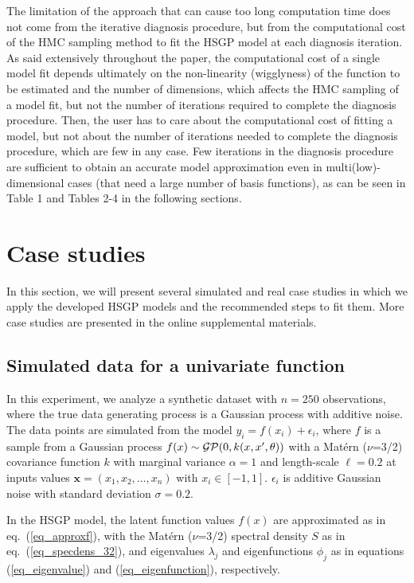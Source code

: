 {\color{blue}The limitation of the approach that can cause too long computation time does not come from the iterative diagnosis procedure, but from the computational cost of the HMC sampling method to fit the HSGP model at each diagnosis iteration. As said extensively throughout the paper, the computational cost of a single model fit depends ultimately on the non-linearity (wigglyness) of the function to be estimated and the number of dimensions, which affects the HMC sampling of a model fit, but not the number of iterations required to complete the diagnosis procedure. Then, the user has to care about the computational cost of fitting a model, but not about the number of iterations needed to complete the diagnosis procedure, which are few in any case. Few iterations in the diagnosis procedure are sufficient to obtain an accurate model approximation even in multi(low)-dimensional cases (that need a large number of basis functions), as can be seen in Table 1 and Tables 2-4 in the following sections.}


\section{Case studies}\label{sec_cases}

In this section, we will present several simulated and real case studies in which we apply the developed HSGP models and the recommended steps to fit them. More case studies are presented in the online supplemental materials.

\subsection{Simulated data for a univariate function}\label{sec_univariate_simu}

In this experiment, we analyze a synthetic dataset with $n = 250$ observations, where the true data generating process is a Gaussian process with additive noise. The data points are simulated from the model $y_i = f(x_i) + \epsilon_i$, where $f$ is a sample from a Gaussian process $f(x) \sim \operatorname{\mathcal{GP}}(0, k(x, x', \theta))$ with a Mat{\'e}rn ($\nu$=3/2) covariance function $k$ with marginal variance $\alpha=1$ and length-scale $\ell=0.2$ at inputs values $\bm{x}=(x_1,x_2,\dots,x_n)$ with $x_i \in [-1,1]$. $\epsilon_i$ is additive Gaussian noise with standard deviation $\sigma=0.2$. 

In the HSGP model, the latent function values $f(x)$ are approximated as in eq.~(\ref{eq_approxf}), with the Mat{\'e}rn ($\nu$=3/2) spectral density $S$ as in eq.~(\ref{eq_specdens_32}), and eigenvalues $\lambda_j$ and eigenfunctions $\phi_j$ as in equations (\ref{eq_eigenvalue}) and (\ref{eq_eigenfunction}), respectively.  

